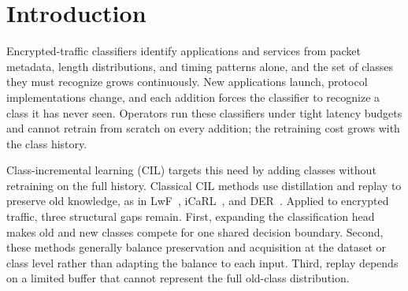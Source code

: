 %
%

\section{Introduction}

Encrypted-traffic classifiers identify applications and services from packet metadata, length distributions, and timing patterns alone, and the set of classes they must recognize grows continuously. New applications launch, protocol implementations change, and each addition forces the classifier to recognize a class it has never seen. Operators run these classifiers under tight latency budgets and cannot retrain from scratch on every addition; the retraining cost grows with the class history.

Class-incremental learning (CIL) targets this need by adding classes without retraining on the full history. Classical CIL methods use distillation and replay to preserve old knowledge, as in LwF~\cite{li2017lwf}, iCaRL~\cite{rebuffi2017icarl}, and DER~\cite{yan2021der}. Applied to encrypted traffic, three structural gaps remain. First, expanding the classification head makes old and new classes compete for one shared decision boundary. Second, these methods generally balance preservation and acquisition at the dataset or class level rather than adapting the balance to each input. Third, replay depends on a limited buffer that cannot represent the full old-class distribution.

